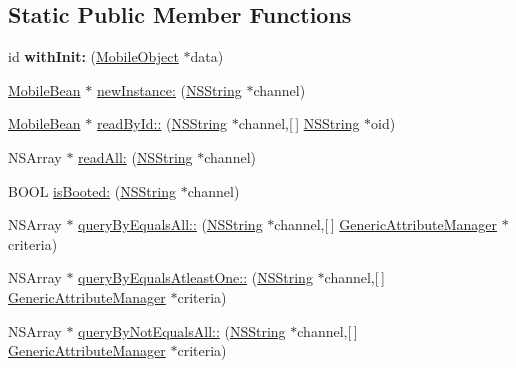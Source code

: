 \subsection*{\-Static \-Public \-Member \-Functions}
\begin{DoxyCompactItemize}
\item 
\hypertarget{interface_mobile_bean_a603748158f929bb1d2ba503996bf19c6}{
id {\bfseries with\-Init\-:} (\hyperlink{interface_mobile_object}{\-Mobile\-Object} $\ast$data)}
\label{interface_mobile_bean_a603748158f929bb1d2ba503996bf19c6}

\item 
\hyperlink{interface_mobile_bean}{\-Mobile\-Bean} $\ast$ \hyperlink{interface_mobile_bean_a057a773dfb42af5bba5b4d66906c02d6}{new\-Instance\-:} (\hyperlink{class_n_s_string}{\-N\-S\-String} $\ast$channel)
\item 
\hyperlink{interface_mobile_bean}{\-Mobile\-Bean} $\ast$ \hyperlink{interface_mobile_bean_add178c1be67319073729cbde05fdd7d6}{read\-By\-Id\-::} (\hyperlink{class_n_s_string}{\-N\-S\-String} $\ast$channel,\mbox{[}$\,$\mbox{]} \hyperlink{class_n_s_string}{\-N\-S\-String} $\ast$oid)
\item 
\-N\-S\-Array $\ast$ \hyperlink{interface_mobile_bean_a124a6d20066ae3827f392f6be18ef68e}{read\-All\-:} (\hyperlink{class_n_s_string}{\-N\-S\-String} $\ast$channel)
\item 
\-B\-O\-O\-L \hyperlink{interface_mobile_bean_a2497377110c750f933d89cfdc05ac34e}{is\-Booted\-:} (\hyperlink{class_n_s_string}{\-N\-S\-String} $\ast$channel)
\item 
\-N\-S\-Array $\ast$ \hyperlink{interface_mobile_bean_a41627ec92b2469c6d90d8770b4a7143f}{query\-By\-Equals\-All\-::} (\hyperlink{class_n_s_string}{\-N\-S\-String} $\ast$channel,\mbox{[}$\,$\mbox{]} \hyperlink{interface_generic_attribute_manager}{\-Generic\-Attribute\-Manager} $\ast$criteria)
\item 
\-N\-S\-Array $\ast$ \hyperlink{interface_mobile_bean_a6d08a46f238b32c0371bbf61726e35d0}{query\-By\-Equals\-Atleast\-One\-::} (\hyperlink{class_n_s_string}{\-N\-S\-String} $\ast$channel,\mbox{[}$\,$\mbox{]} \hyperlink{interface_generic_attribute_manager}{\-Generic\-Attribute\-Manager} $\ast$criteria)
\item 
\-N\-S\-Array $\ast$ \hyperlink{interface_mobile_bean_aa5161717f1beb0e558b99757431b8d55}{query\-By\-Not\-Equals\-All\-::} (\hyperlink{class_n_s_string}{\-N\-S\-String} $\ast$channel,\mbox{[}$\,$\mbox{]} \hyperlink{interface_generic_attribute_manager}{\-Generic\-Attribute\-Manager} $\ast$criteria)

\end{DoxyCompactItemize}
